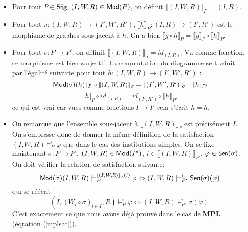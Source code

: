 \documentclass[11pt,a4paper]{article}
\newcommand{\ph}{\varphi}
\newcommand{\itemz}{\item[$\triangleright$]}
\newcommand{\gr}{\textbf}
\renewcommand{\iff}{\Leftrightarrow}
\newcommand{\lb}{\llbracket}
\newcommand{\rb}{\rrbracket}
\newcommand{\info}[1]{\text{{\fontfamily{lmss}\selectfont #1}}}
\newcommand{\Mod}{\info{Mod}}
\newcommand{\Sen}{\info{Sen}}
\newcommand{\1}{\mathbbm{1}}
\begin{document}
\begin{itemize}
\setlength\itemsep{-0.3em}
\itemz Pour tout $P \in \gr{Sig}$, $(I,W,R) \in \Mod(P)$, on définit $\lb (I,W,R) \rb_P = (I,R)$.
\itemz Pour tout $h : (I,W,R) \to (I',W',R')$, $\lb h \rb_P : (I,R) \to (I',R')$ est le morphisme de graphes sous-jacent à $h$. On a bien $\lb g \circ h \rb_P = \lb g \rb_P \circ \lb h \rb_P$.
\itemz Pour tout $\sigma : P \to P'$, on définit $\lb (I,W,R) \rb_\sigma = id_{(I,R)}$. Vu comme fonction, ce morphisme est bien surjectif. La commutation du diagramme se traduit par l'égalité suivante pour tout $h : (I,W,R) \to (I',W',R')$ :
\[ \lb \Mod(\sigma)(h) \rb_P \circ \lb (I,W,R) \rb_\sigma =  \lb (I',W',R') \rb_\sigma \circ \lb h \rb_{P'}\]
\[ \lb h \rb_P \circ id_{(I,R)} = id_{(I',R')} \circ \lb h \rb_{P'} \]
ce qui est vrai car vues comme fonctions $I \to I'$ cela s'écrit $h = h$.
\itemz On remarque que l'ensemble sous-jacent à $\lb (I,W,R) \rb_P$ est précisément $I$. On s'empresse donc de donner la même définition de la satisfaction $(I,W,R) \models_P^i \ph$ que dans le cas des institutions simples. On se fixe maintenant $\sigma : P \to P'$, $(I,W,R) \in \Mod(P')$, $i \in \lb (I,W,R) \rb_{P'}$, $\ph \in \Sen(\sigma)$. On doit vérifier la relation de satisfaction suivante:
\[ \Mod(\sigma)(I,W,R) \models_P^{\lb (I,W,R) \rb_\sigma (i)} \ph \iff (I,W,R) \models_{P'}^i \Sen(\sigma)(\ph)\]
qui se réécrit
\[ (I,(W_i \circ \sigma)_{i \in I}, R) \models_P^{i} \ph \iff (I,W,R) \models_{P'}^i \sigma(\ph) \]
C'est exactement ce que nous avons déjà prouvé dans le cas de $\gr{MPL}$ (équation (\ref{mplsat})).
\end{itemize}
\end{document}
